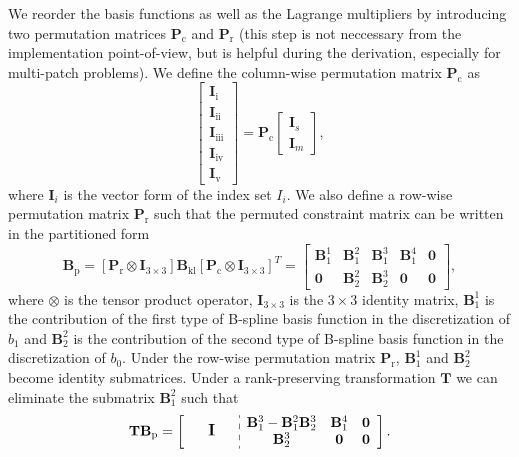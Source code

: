 We reorder the basis functions as well as the Lagrange multipliers by introducing two permutation matrices $\mathbf{P}_\text{c}$ and $\mathbf{P}_\text{r}$ (this step is not neccessary from the implementation point-of-view, but is helpful during the derivation, especially for multi-patch problems). We define the column-wise permutation matrix $\mathbf{P}_\text{c}$ as
\begin{equation}
	\begin{bmatrix}
		\mathbf{I}_\text{i}   \\
		\mathbf{I}_\text{ii}  \\
		\mathbf{I}_\text{iii} \\
		\mathbf{I}_\text{iv}  \\
		\mathbf{I}_\text{v}
	\end{bmatrix}=
	\mathbf{P}_\text{c}
	\begin{bmatrix}
		\mathbf{I}_s \\
		\mathbf{I}_m
	\end{bmatrix},
\end{equation}
where $\mathbf{I}_i$ is the vector form of the index set  $I_i$. We also define a row-wise permutation matrix $\mathbf{P}_\text{r}$ such that the permuted constraint matrix can be written in the partitioned form
\begin{equation}
	\mathbf{B}_\text{p}=\left[ \mathbf{P}_\text{r}\otimes\mathbf{I}_{3\times 3} \right]\mathbf{B}_\text{kl}\left[\mathbf{P}_\text{c}\otimes\mathbf{I}_{3\times 3}\right]^T=
	\begin{bmatrix}
		\mathbf{B}_1^1 & \mathbf{B}_1^2 & \mathbf{B}_1^3 & \mathbf{B}_1^4 & \mathbf{0} \\
		\mathbf{0}     & \mathbf{B}_2^2 & \mathbf{B}_2^3 & \mathbf{0}     & \mathbf{0}
	\end{bmatrix},
\end{equation}
where $\otimes$ is the tensor product operator, $\mathbf{I}_{3\times 3}$ is the ${3\times 3}$ identity matrix, $\mathbf{B}_1^1$ is the contribution of the first type of B-spline basis function in the discretization of $b_1$ and $\mathbf{B}_2^2$ is the contribution of the second type of B-spline basis function in the discretization of $b_0$. Under the row-wise permutation matrix $\mathbf{P}_\text{r}$, $\mathbf{B}_1^1$ and $\mathbf{B}_2^2$ become identity submatrices. Under a rank-preserving transformation $\mathbf{T}$ we can eliminate the submatrix $\mathbf{B}_1^2$ such that
\begin{equation}
	\sbox0{$\begin{matrix}\mathbf{B}_1^3-\mathbf{B}_1^2\mathbf{B}_2^3 & \mathbf{B}_1^4 & \mathbf{0} \\ \mathbf{B}_2^3 & \mathbf{0} & \mathbf{0}\end{matrix}$}
	\mathbf{T}\mathbf{B}_\text{p}=\left[
		\begin{array}{c:c}
			\makebox[\wd0/3]{\large $\mathbf{I}$} & \usebox{0} \\
		\end{array}
		\right].\label{eq:simple_form}
\end{equation}
